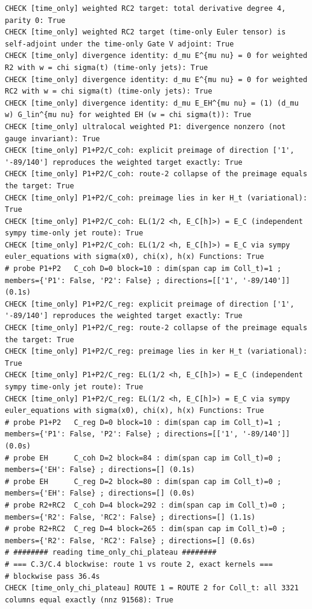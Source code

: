 \documentclass{article}
\theoremstyle{remark}
\begin{document}
\begin{lstlisting}
CHECK [time_only] weighted RC2 target: total derivative degree 4, parity 0: True
CHECK [time_only] weighted RC2 target (time-only Euler tensor) is self-adjoint under the time-only Gate V adjoint: True
CHECK [time_only] divergence identity: d_mu E^{mu nu} = 0 for weighted R2 with w = chi sigma(t) (time-only jets): True
CHECK [time_only] divergence identity: d_mu E^{mu nu} = 0 for weighted RC2 with w = chi sigma(t) (time-only jets): True
CHECK [time_only] divergence identity: d_mu E_EH^{mu nu} = (1) (d_mu w) G_lin^{mu nu} for weighted EH (w = chi sigma(t)): True
CHECK [time_only] ultralocal weighted P1: divergence nonzero (not gauge invariant): True
CHECK [time_only] P1+P2/C_coh: explicit preimage of direction ['1', '-89/140'] reproduces the weighted target exactly: True
CHECK [time_only] P1+P2/C_coh: route-2 collapse of the preimage equals the target: True
CHECK [time_only] P1+P2/C_coh: preimage lies in ker H_t (variational): True
CHECK [time_only] P1+P2/C_coh: EL(1/2 <h, E_C[h]>) = E_C (independent sympy time-only jet route): True
CHECK [time_only] P1+P2/C_coh: EL(1/2 <h, E_C[h]>) = E_C via sympy euler_equations with sigma(x0), chi(x), h(x) Functions: True
# probe P1+P2   C_coh D=0 block=10 : dim(span cap im Coll_t)=1 ; members={'P1': False, 'P2': False} ; directions=[['1', '-89/140']] (0.1s)
CHECK [time_only] P1+P2/C_reg: explicit preimage of direction ['1', '-89/140'] reproduces the weighted target exactly: True
CHECK [time_only] P1+P2/C_reg: route-2 collapse of the preimage equals the target: True
CHECK [time_only] P1+P2/C_reg: preimage lies in ker H_t (variational): True
CHECK [time_only] P1+P2/C_reg: EL(1/2 <h, E_C[h]>) = E_C (independent sympy time-only jet route): True
CHECK [time_only] P1+P2/C_reg: EL(1/2 <h, E_C[h]>) = E_C via sympy euler_equations with sigma(x0), chi(x), h(x) Functions: True
# probe P1+P2   C_reg D=0 block=10 : dim(span cap im Coll_t)=1 ; members={'P1': False, 'P2': False} ; directions=[['1', '-89/140']] (0.0s)
# probe EH      C_coh D=2 block=84 : dim(span cap im Coll_t)=0 ; members={'EH': False} ; directions=[] (0.1s)
# probe EH      C_reg D=2 block=80 : dim(span cap im Coll_t)=0 ; members={'EH': False} ; directions=[] (0.0s)
# probe R2+RC2  C_coh D=4 block=292 : dim(span cap im Coll_t)=0 ; members={'R2': False, 'RC2': False} ; directions=[] (1.1s)
# probe R2+RC2  C_reg D=4 block=265 : dim(span cap im Coll_t)=0 ; members={'R2': False, 'RC2': False} ; directions=[] (0.6s)
# ######## reading time_only_chi_plateau ########
# === C.3/C.4 blockwise: route 1 vs route 2, exact kernels ===
# blockwise pass 36.4s
CHECK [time_only_chi_plateau] ROUTE 1 = ROUTE 2 for Coll_t: all 3321 columns equal exactly (nnz 91568): True

\end{lstlisting}
\end{document}
